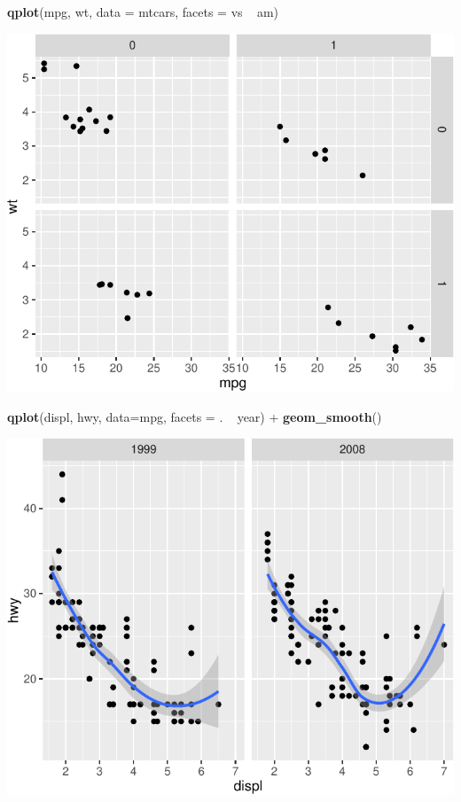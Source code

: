 \documentclass[]{article}
\newenvironment{Shaded}{\begin{snugshade}}{\end{snugshade}}
\newcommand{\KeywordTok}[1]{\textcolor[rgb]{0.13,0.29,0.53}{\textbf{{#1}}}}
\newcommand{\DataTypeTok}[1]{\textcolor[rgb]{0.13,0.29,0.53}{{#1}}}
\newcommand{\StringTok}[1]{\textcolor[rgb]{0.31,0.60,0.02}{{#1}}}
\newcommand{\NormalTok}[1]{{#1}}
\numberwithin{equation}{section}
\begin{document}
\begin{Shaded}
\begin{Highlighting}[]
\KeywordTok{qplot}\NormalTok{(mpg, wt, }\DataTypeTok{data =} \NormalTok{mtcars, }\DataTypeTok{facets =} \NormalTok{vs ~}\StringTok{ }\NormalTok{am)}
\end{Highlighting}
\end{Shaded}

\includegraphics{index_files/figure-latex/unnamed-chunk-235-6.pdf}

\begin{Shaded}
\begin{Highlighting}[]
\KeywordTok{qplot}\NormalTok{(displ, hwy, }\DataTypeTok{data=}\NormalTok{mpg, }\DataTypeTok{facets =} \NormalTok{. ~}\StringTok{ }\NormalTok{year) +}\StringTok{ }\KeywordTok{geom_smooth}\NormalTok{()}
\end{Highlighting}
\end{Shaded}

\includegraphics{index_files/figure-latex/unnamed-chunk-235-7.pdf}
\end{document}
